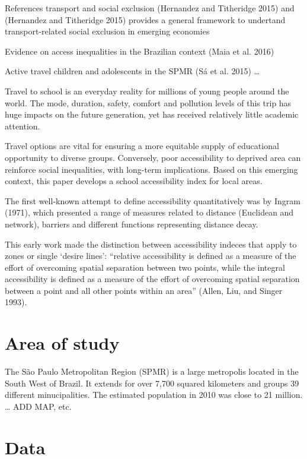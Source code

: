 \documentclass[]{article}
\begin{document}
References transport and social exclusion (Hernandez and Titheridge
2015) and (Hernandez and Titheridge 2015) provides a general framework
to undertand transport-related social exclusion in emerging economies

Evidence on access inequalities in the Brazilian context (Maia et al.
2016)

Active travel children and adolescents in the SPMR (Sá et al. 2015)
\ldots{}

Travel to school is an everyday reality for millions of young people
around the world. The mode, duration, safety, comfort and pollution
levels of this trip has huge impacts on the future generation, yet has
received relatively little academic attention.

Travel options are vital for ensuring a more equitable supply of
educational opportunity to diverse groups. Conversely, poor
accessibility to deprived area can reinforce social inequalities, with
long-term implications. Based on this emerging context, this paper
develops a school accessibility index for local areas.

The first well-known attempt to define accessibility quantitatively was
by Ingram (1971), which presented a range of measures related to
distance (Euclidean and network), barriers and different functions
representing distance decay.

This early work made the distinction between accessibility indeces that
apply to zones or single `desire lines': ``relative accessibility is
defined as a measure of the effort of overcoming spatial separation
between two points, while the integral accessibility is defined as a
measure of the effort of overcoming spatial separation between a point
and all other points within an area'' (Allen, Liu, and Singer 1993).

\section{Area of study}\label{area-of-study}

The São Paulo Metropolitan Region (SPMR) is a large metropolis located
in the South West of Brazil. It extends for over 7,700 squared
kilometers and groups 39 different minucipalities. The estimated
population in 2010 was close to 21 million. \ldots{} ADD MAP, etc.

\section{Data}\label{data}
\end{document}
